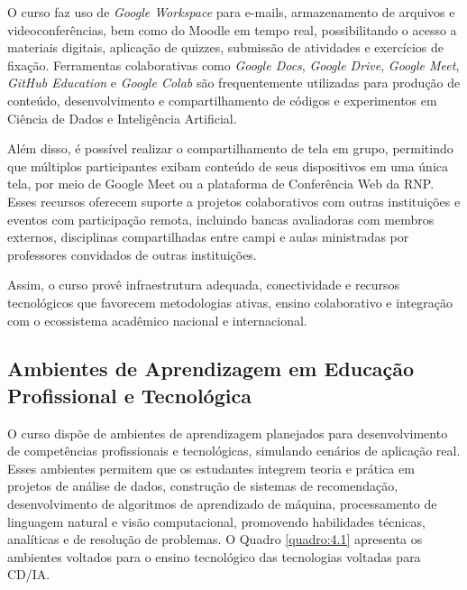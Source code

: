 O curso faz uso de \textit{Google Workspace} para e-mails, armazenamento de arquivos e videoconferências, bem como do Moodle em tempo real, possibilitando o acesso a materiais digitais, aplicação de quizzes, submissão de atividades e exercícios de fixação. Ferramentas colaborativas como \textit{Google Docs}, \textit{Google Drive}, \textit{Google Meet}, \textit{GitHub Education} e \textit{Google Colab} são frequentemente utilizadas para produção de conteúdo, desenvolvimento e compartilhamento de códigos e experimentos em Ciência de Dados e Inteligência Artificial.

Além disso, é possível realizar o compartilhamento de tela em grupo, permitindo que múltiplos participantes exibam conteúdo de seus dispositivos em uma única tela, por meio de Google Meet ou a plataforma de Conferência Web da RNP. Esses recursos oferecem suporte a projetos colaborativos com outras instituições e eventos com participação remota, incluindo bancas avaliadoras com membros externos, disciplinas compartilhadas entre campi e aulas ministradas por professores convidados de outras instituições.

Assim, o curso provê infraestrutura adequada, conectividade e recursos tecnológicos que favorecem metodologias ativas, ensino colaborativo e integração com o ecossistema acadêmico nacional e internacional.

\subsection{Ambientes de Aprendizagem em Educação Profissional e Tecnológica}

O curso dispõe de ambientes de aprendizagem planejados para desenvolvimento de competências profissionais e tecnológicas, simulando cenários de aplicação real. Esses ambientes permitem que os estudantes integrem teoria e prática em projetos de análise de dados, construção de sistemas de recomendação, desenvolvimento de algoritmos de aprendizado de máquina, processamento de linguagem natural e visão computacional, promovendo habilidades técnicas, analíticas e de resolução de problemas. O Quadro \ref{quadro:4.1} apresenta os ambientes voltados para o ensino tecnológico das tecnologias voltadas para CD/IA.


